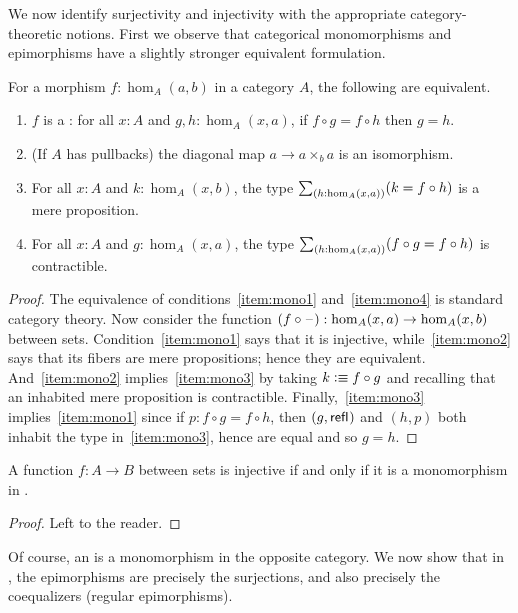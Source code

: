 We now identify surjectivity and injectivity with the appropriate cat\-e\-go\-ry-theoretic notions.
First we observe that categorical monomorphisms and epimorphisms have a slightly stronger equivalent formulation.

\begin{lem}\label{thm:mono}
  For a morphism $f:\hom_A(a,b)$ in a category $A$, the following are equivalent.
  \begin{enumerate}
  \item $f$ is a :
    for all $x:A$ and ${g,h:\hom_A(x,a)}$, if $f\circ g = f\circ h$ then $g=h$.\label{item:mono1}
  \item (If $A$ has pullbacks) the diagonal map $a\to a\times_b a$ is an isomorphism.\label{item:mono4}
  \item For all $x:A$ and $k:\hom_A(x,b)$, the type $\sm{h:\hom_A(x,a)} (k = f\circ h)$ is a mere proposition.\label{item:mono2}
  \item For all $x:A$ and ${g:\hom_A(x,a)}$, the type $\sm{h:\hom_A(x,a)} (f\circ g = f\circ h)$ is contractible.\label{item:mono3}
  \end{enumerate}
\end{lem}
\begin{proof}
  The equivalence of conditions~\ref{item:mono1} and~\ref{item:mono4} is standard category theory.
  Now consider the function $(f\circ \mathord{\hspace{1pt}\text{--}\hspace{1pt}} ):\hom_A(x,a) \to \hom_A(x,b)$ between sets.
  Condition~\ref{item:mono1} says that it is injective, while~\ref{item:mono2} says that its fibers are mere propositions; hence they are equivalent.
  And~\ref{item:mono2} implies~\ref{item:mono3} by taking $k\vcentcolon\equiv f\circ g$ and recalling that an inhabited mere proposition is contractible.
  Finally,~\ref{item:mono3} implies~\ref{item:mono1} since if $p:f\circ g= f\circ h$, then $(g,\mathsf{refl}_{})$ and $(h,p)$ both inhabit the type in~\ref{item:mono3}, hence are equal and so $g=h$.
\end{proof}

\begin{lem}\label{thm:inj-mono}
  A function $f:A\to B$ between sets is injective if and only if it is a monomorphism in \uset.
\end{lem}
\begin{proof}
  Left to the reader.
\end{proof}

Of course, an 
%
%
is a monomorphism in the opposite category.
We now show that in \uset, the epimorphisms are precisely the surjections, and also precisely the coequalizers (regular epimorphisms).

